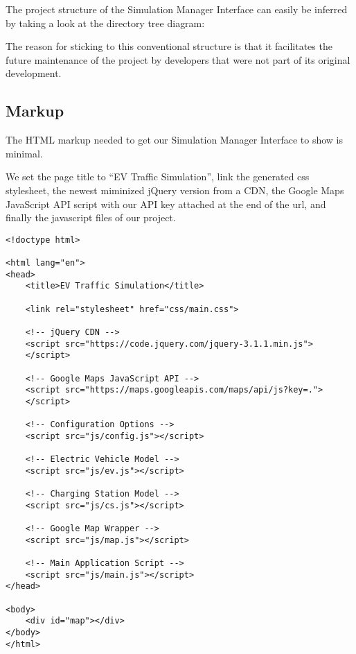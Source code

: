 The project structure of the Simulation Manager Interface can easily be inferred by taking a look at the directory tree diagram:

\vspace{2mm}
\setlength{\DTbaselineskip}{11pt}
\vspace{2mm}

The reason for sticking to this conventional structure is that it facilitates the future maintenance of the project by developers that were not part of its original development.


\subsection{Markup}

The HTML markup needed to get our Simulation Manager Interface to show is minimal.

We set the page title to ``EV Traffic Simulation'', link the generated css stylesheet, the newest miminized jQuery version from a CDN, the Google Maps JavaScript API script with our API key attached at the end of the url, and finally the javascript files of our project.

\begin{verbatim}
<!doctype html>

<html lang="en">
<head>
    <title>EV Traffic Simulation</title>

    <link rel="stylesheet" href="css/main.css">

    <!-- jQuery CDN -->
    <script src="https://code.jquery.com/jquery-3.1.1.min.js">
    </script>

    <!-- Google Maps JavaScript API -->
    <script src="https://maps.googleapis.com/maps/api/js?key=.">
    </script>

    <!-- Configuration Options -->
    <script src="js/config.js"></script>

    <!-- Electric Vehicle Model -->
    <script src="js/ev.js"></script>

    <!-- Charging Station Model -->
    <script src="js/cs.js"></script>

    <!-- Google Map Wrapper -->
    <script src="js/map.js"></script>

    <!-- Main Application Script -->
    <script src="js/main.js"></script>
</head>

<body>
    <div id="map"></div>
</body>
</html>
\end{verbatim}

